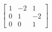 \documentclass[preview]{standalone}
\begin{document}
\begin{align*}
\begin{bmatrix} 1 & -2 & 1 \\ 0 & 1 & -2 \\ 0 & 0 & 1 \end{bmatrix}
\end{align*}
\end{document}

